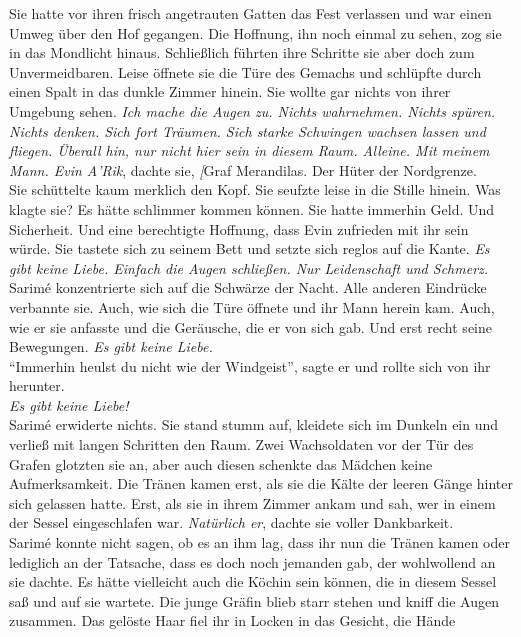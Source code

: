 Sie hatte vor ihren frisch angetrauten Gatten das Fest verlassen und war einen Umweg über den Hof 
gegangen. Die Hoffnung, ihn noch einmal zu sehen, zog sie in das Mondlicht hinaus. Schließlich 
führten ihre Schritte sie aber doch zum Unvermeidbaren. Leise öffnete sie die Türe des Gemachs und 
schlüpfte durch einen Spalt in das dunkle Zimmer hinein. Sie wollte gar nichts von ihrer Umgebung 
sehen. \textit{Ich mache die Augen zu. Nichts wahrnehmen. Nichts spüren. Nichts denken. Sich fort 
Träumen. Sich starke Schwingen wachsen lassen und fliegen. Überall hin, nur nicht hier sein in 
diesem Raum. Alleine. Mit meinem Mann. Evin A'Rik}, dachte sie, \textit[{Graf Merandilas. Der 
Hüter der Nordgrenze.}\\
Sie schüttelte kaum merklich den Kopf. Sie seufzte leise in die Stille hinein. Was klagte sie? 
Es hätte schlimmer kommen können. Sie hatte immerhin Geld. Und Sicherheit. Und eine berechtigte 
Hoffnung, dass Evin zufrieden mit ihr sein würde. Sie tastete sich zu seinem Bett und setzte sich 
reglos auf die Kante. \textit{Es gibt keine Liebe. Einfach die Augen schließen. Nur Leidenschaft 
und Schmerz.}\\
Sarimé konzentrierte sich auf die Schwärze der Nacht. Alle anderen Eindrücke verbannte sie. Auch, 
wie sich die Türe öffnete und ihr Mann herein kam. Auch, wie er sie anfasste und die Geräusche, die 
er von sich gab. Und erst recht seine Bewegungen. \textit{Es gibt keine Liebe.}\\
``Immerhin heulst du nicht wie der Windgeist'', sagte er und rollte sich von ihr herunter.\\
\textit{Es gibt keine Liebe!}\\
Sarimé erwiderte nichts. Sie stand stumm auf, kleidete sich im Dunkeln ein und verließ mit langen 
Schritten den Raum. Zwei Wachsoldaten vor der Tür des Grafen glotzten sie an, aber auch diesen 
schenkte das Mädchen keine Aufmerksamkeit. Die Tränen kamen erst, als sie die Kälte der leeren 
Gänge hinter sich gelassen hatte. Erst, als sie in ihrem Zimmer ankam und sah, wer in einem der 
Sessel eingeschlafen war. \textit{Natürlich er}, dachte sie voller Dankbarkeit.\\
Sarimé konnte nicht sagen, ob es an ihm lag, dass ihr nun die Tränen kamen oder lediglich an der 
Tatsache, dass es doch noch jemanden gab, der wohlwollend an sie dachte. Es hätte vielleicht auch 
die Köchin sein können, die in diesem Sessel saß und auf sie wartete. Die junge Gräfin blieb starr 
stehen und kniff die Augen zusammen. Das gelöste Haar fiel ihr in Locken in das Gesicht, die Hände 
